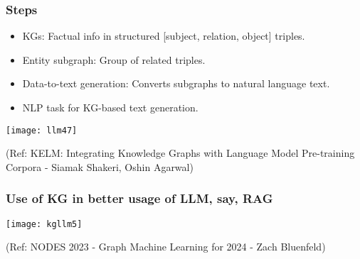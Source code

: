 \begin{frame}[fragile]\frametitle{Steps}

\begin{itemize}
\item  KGs: Factual info in structured [subject, relation, object] triples.
\item  Entity subgraph: Group of related triples.
\item  Data-to-text generation: Converts subgraphs to natural language text.
\item  NLP task for KG-based text generation.
\end{itemize}

\begin{center}
\texttt{[image: llm47]}
\end{center}	

{\tiny (Ref: KELM: Integrating Knowledge Graphs with Language Model Pre-training Corpora - Siamak Shakeri, Oshin Agarwal)}
\end{frame}

\begin{frame}[fragile]\frametitle{Use of KG in better usage of LLM, say, RAG}

\begin{center}
\texttt{[image: kgllm5]}
\end{center}	

{\tiny (Ref: NODES 2023 - Graph Machine Learning for 2024 - Zach Bluenfeld)}

\end{frame}







